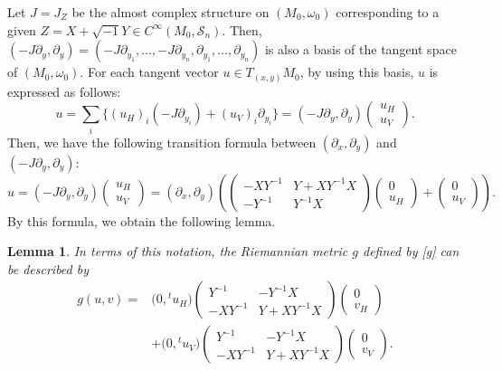 \documentclass[pdftex]{sigma}
\numberwithin{equation}{section}
\newtheorem{Lemma}[Theorem]{Lemma}
\begin{document}
Let $J=J_Z$ be the almost complex structure on $(M_0,\omega_0)$ corresponding to a given $Z=X+\sqrt{-1}Y\in C^\infty ( M_0,{\mathcal S}_n)$. Then, $(-J\partial_y, \partial_y)= (-J\partial_{y_1},\ldots,-J\partial_{y_n}, \partial_{y_1},\ldots ,\partial_{y_n} )$ is also a basis of the tangent space of $(M_0,\omega_0)$. For each tangent vector $u\in T_{(x,y)}M_0$, by using this basis, $u$ is expressed as follows:
\[
u=\sum_i\{ (u_H)_i(-J\partial_{y_i})+(u_V)_i\partial_{y_i}\}=(-J\partial_y, \partial_y)
\begin{pmatrix}
u_H\\
u_V
\end{pmatrix}.
\]
Then, we have the following transition formula between $ (\partial_x, \partial_y )$ and $(-J\partial_y, \partial_y)$:
\begin{equation*}%
u=(-J\partial_y, \partial_y)
\begin{pmatrix}
u_H\\
u_V
\end{pmatrix}
=(\partial_x, \partial_y)\left(
\begin{pmatrix}
-XY^{-1} & Y+XY^{-1}X \\
-Y^{-1} & Y^{-1}X
\end{pmatrix}
\begin{pmatrix}
0\\
u_H
\end{pmatrix}
+
\begin{pmatrix}
0\\
u_V
\end{pmatrix}
\right) .
\end{equation*}
By this formula, we obtain the following lemma.
\begin{Lemma}\label{g2}
In terms of this notation, the Riemannian metric $g$ defined by \eqref{g} can be described by
\begin{align*}
g(u,v)={}&\bigl(0,{}^tu_H\bigr)
\begin{pmatrix}
Y^{-1} & -Y^{-1}X \\
-XY^{-1} & Y+XY^{-1}X
\end{pmatrix}
\begin{pmatrix}
0\\
v_H
\end{pmatrix}\\
&
+\bigl(0,{}^tu_V\bigr)
\begin{pmatrix}
Y^{-1} & -Y^{-1}X \\
-XY^{-1} & Y+XY^{-1}X
\end{pmatrix}
\begin{pmatrix}
0\\
v_V
\end{pmatrix}.
\end{align*}
\end{Lemma}
\end{document}
